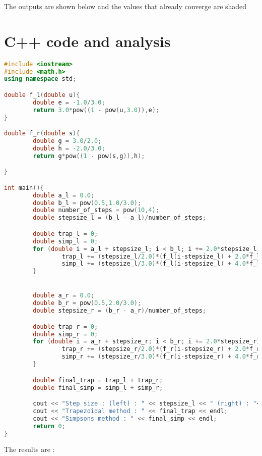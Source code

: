 \documentclass[a4paper,10pt]{article}
\begin{document}
The outputs are shown below and the values that already converge are shaded



\newpage

\section*{C++ code and analysis}
\begin{lstlisting}[language=c++]
#include <iostream>
#include <math.h>
using namespace std;

double f_l(double u){
        double e = -1.0/3.0;
        return 3.0*pow((1 - pow(u,3.0)),e);
}

double f_r(double s){
        double g = 3.0/2.0;
        double h = -2.0/3.0;
        return g*pow((1 - pow(s,g)),h);

}

int main(){
        double a_l = 0.0;
        double b_l = pow(0.5,1.0/3.0);
        double number_of_steps = pow(10,4);
        double stepsize_l = (b_l - a_l)/number_of_steps;

        double trap_l = 0;
        double simp_l = 0;
        for (double i = a_l + stepsize_l; i < b_l; i += 2.0*stepsize_l){
                trap_l += (stepsize_l/2.0)*(f_l(i-stepsize_l) + 2.0*f_l(i) + f_l(i+stepsize_l));
                simp_l += (stepsize_l/3.0)*(f_l(i-stepsize_l) + 4.0*f_l(i) + f_l(i+stepsize_l));
        }


        double a_r = 0.0;
        double b_r = pow(0.5,2.0/3.0);
        double stepsize_r = (b_r - a_r)/number_of_steps;

        double trap_r = 0;
        double simp_r = 0;
        for (double i = a_r + stepsize_r; i < b_r; i += 2.0*stepsize_r){
                trap_r += (stepsize_r/2.0)*(f_r(i-stepsize_r) + 2.0*f_r(i) + f_r(i+stepsize_r));
                simp_r += (stepsize_r/3.0)*(f_r(i-stepsize_r) + 4.0*f_r(i) + f_r(i+stepsize_r));
        }       

        double final_trap = trap_l + trap_r;
        double final_simp = simp_l + simp_r;

        cout << "Step size : (left) : " << stepsize_l << " (right) : "<< stepsize_r << endl;
        cout << "Trapezoidal method : " << final_trap << endl;
        cout << "Simpsons method : " << final_simp << endl;
        return 0;
}
\end{lstlisting}

The results are :


\end{document}
